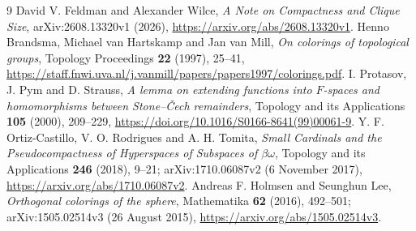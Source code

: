 \documentclass[11pt]{article}
\begin{document}
\begin{thebibliography}{9}
David V. Feldman and Alexander Wilce,
\emph{A Note on Compactness and Clique Size},
arXiv:2608.13320v1 (2026),
\url{https://arxiv.org/abs/2608.13320v1}.
Henno Brandsma, Michael van Hartskamp and Jan van Mill,
\emph{On colorings of topological groups},
Topology Proceedings \textbf{22} (1997), 25--41,
\url{https://staff.fnwi.uva.nl/j.vanmill/papers/papers1997/colorings.pdf}.
I. Protasov, J. Pym and D. Strauss,
\emph{A lemma on extending functions into $F$-spaces and homomorphisms
between Stone--\v{C}ech remainders},
Topology and its Applications \textbf{105} (2000), 209--229,
\url{https://doi.org/10.1016/S0166-8641(99)00061-9}.
Y. F. Ortiz-Castillo, V. O. Rodrigues and A. H. Tomita,
\emph{Small Cardinals and the Pseudocompactness of Hyperspaces of
Subspaces of $\beta\omega$},
Topology and its Applications \textbf{246} (2018), 9--21;
arXiv:1710.06087v2 (6 November 2017),
\url{https://arxiv.org/abs/1710.06087v2}.
Andreas F. Holmsen and Seunghun Lee,
\emph{Orthogonal colorings of the sphere},
Mathematika \textbf{62} (2016), 492--501;
arXiv:1505.02514v3 (26 August 2015),
\url{https://arxiv.org/abs/1505.02514v3}.
\end{thebibliography}
\end{document}
